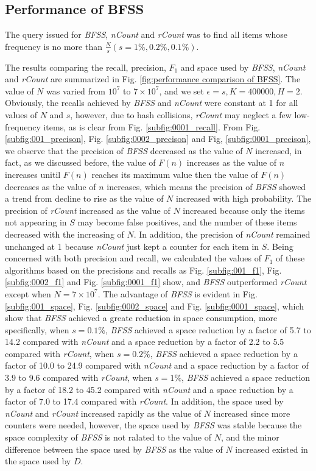 \documentclass[conference]{IEEEtran}
\begin{document}
\subsection{Performance of BFSS}
The query issued for \emph{BFSS}, \emph{nCount} and \emph{rCount} was to find all items whose frequency is no more than $\frac{N}{s}(s=1\%,0.2\%,0.1\%)$.\par
The results comparing the recall, precision, $F_1$ and space used by \emph{BFSS}, \emph{nCount} and \emph{rCount} are summarized in Fig. \ref{fig:performance comparison of BFSS}. The value of $N$ was varied from $10^7$ to $7\times 10^7$, and we set $\epsilon=s,K=400000,H=2$. Obviously, the recalls achieved by \emph{BFSS} and \emph{nCount} were constant at 1 for all values of $N$ and $s$, however, due to hash collisions, \emph{rCount} may neglect a few low-frequency items, as is clear from Fig. \ref{subfig:0001_recall}. From Fig. \ref{subfig:001_precison}, Fig. \ref{subfig:0002_precison} and Fig, \ref{subfig:0001_precison}, we observe that the precision of \emph{BFSS} decreased as the value of $N$ increased, in fact, as we discussed before, the value of $F(n)$ increases as the value of $n$ increases unitil $F(n)$ reaches its maximum value then the value of $F(n)$ decreases as the value of $n$ increases, which means the precision of \emph{BFSS} showed a trend from decline to rise as the value of $N$ increased with high probability. The precision of \emph{rCount} increased as the value of $N$ increased because only the items not appearing in $S$ may become false positives, and the number of these items decreased with the increasing of $N$. In addition, the precision of \emph{nCount} remained unchanged at 1 because \emph{nCount} just kept a counter for each item in $S$. Being concerned with both precision and recall, we calculated the values of $F_1$ of these algorithms based on the precisions and recalls as Fig. \ref{subfig:001_f1}, Fig. \ref{subfig:0002_f1} and Fig. \ref{subfig:0001_f1} show, and \emph{BFSS} outperformed \emph{rCount} except when $N=7\times 10^7$. The advantage of \emph{BFSS} is evident in Fig. \ref{subfig:001_space}, Fig. \ref{subfig:0002_space} and Fig. \ref{subfig:0001_space}, which show that \emph{BFSS} achieved a greate reduction in space consumption, more specifically, when $s=0.1\%$, \emph{BFSS} achieved a space reduction by a factor of 5.7 to 14.2 compared with \emph{nCount} and a space reduction by a factor of 2.2 to 5.5 compared with \emph{rCount}, when $s=0.2\%$, \emph{BFSS} achieved a space reduction by a factor of 10.0 to 24.9 compared with \emph{nCount} and a space reduction by a factor of 3.9 to 9.6 compared with \emph{rCount}, when $s=1\%$, \emph{BFSS} achieved a space reduction by a factor of 18.2 to 45.2 compared with \emph{nCount} and a space reduction by a factor of 7.0 to 17.4 compared with \emph{rCount}. In addition, the space used by \emph{nCount} and \emph{rCount} increased rapidly as the value of $N$ increased since more counters were needed, however, the space used by \emph{BFSS} was stable because the space complexity of \emph{BFSS} is not ralated to the value of $N$, and the minor difference between the space used by \emph{BFSS} as the value of $N$ increased existed in the space used by $D$.\par
\end{document}
